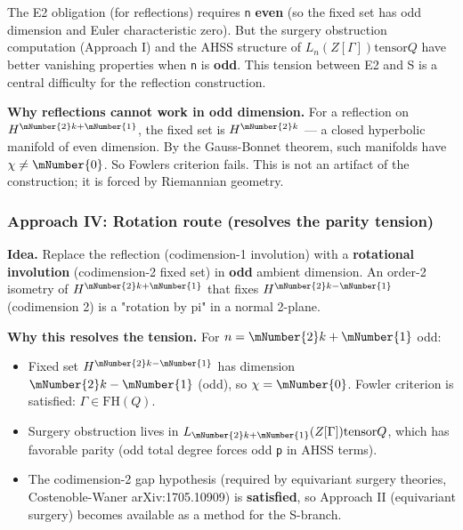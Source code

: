 The E2 obligation (for reflections) requires \texttt{n} \textbf{even} (so the fixed set
has odd dimension and Euler characteristic zero). But the surgery obstruction
computation (Approach I) and the AHSS structure of \(L_{n}(Z[\Gamma]) \text{tensor} Q\)
have better vanishing properties when \texttt{n} is \textbf{odd}. This tension between
E2 and S is a central difficulty for the reflection construction.

\textbf{Why reflections cannot work in odd dimension.} For a reflection on
\(H^{\mNumber{2}k+\mNumber{1}}\), the fixed set is \(H^{\mNumber{2}k}\) --- a closed hyperbolic manifold of
even dimension. By the Gauss-Bonnet theorem, such manifolds have \(\chi \neq \mNumber{0}\).
So Fowler\textquotesingle s criterion fails. This is not an artifact of the construction; it
is forced by Riemannian geometry.

\hypertarget{approach-iv-rotation-route-resolves-the-parity-tension}{%
\subsubsection{Approach IV: Rotation route (resolves the parity tension)}\label{approach-iv-rotation-route-resolves-the-parity-tension}}

\textbf{Idea.} Replace the reflection (codimension-1 involution) with a
\textbf{rotational involution} (codimension-2 fixed set) in \textbf{odd} ambient
dimension. An order-2 isometry of \(H^{\mNumber{2}k+\mNumber{1}}\) that fixes \(H^{\mNumber{2}k-\mNumber{1}}\)
(codimension 2) is a "rotation by pi" in a normal 2-plane.

\textbf{Why this resolves the tension.} For \(n = \mNumber{2}k+\mNumber{1}\) odd:

\begin{itemize}
\tightlist
\item
  Fixed set \(H^{\mNumber{2}k-\mNumber{1}}\) has dimension \(\mNumber{2}k-\mNumber{1}\) (odd), so \(\chi = \mNumber{0}\). Fowler
  criterion is satisfied: \(\Gamma \in \mathup{FH}(Q)\).
\item
  Surgery obstruction lives in \(L_{\mNumber{2}k+\mNumber{1}}(Z[\Gamma]) \text{tensor} Q\), which has
  favorable parity (odd total degree forces odd \texttt{p} in AHSS terms).
\item
  The codimension-2 gap hypothesis (required by equivariant surgery theories,
  Costenoble-Waner arXiv:1705.10909) is \textbf{satisfied}, so Approach II
  (equivariant surgery) becomes available as a method for the S-branch.
\end{itemize}

